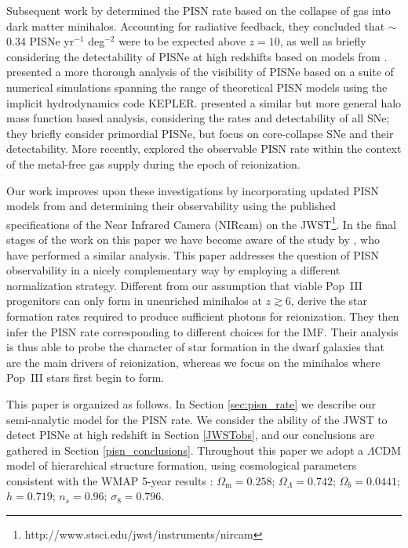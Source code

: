\documentclass[../thesis.tex]{subfiles}
\begin{document}
Subsequent work by \citet{WiseAbel2005} determined the PISN rate based
on the collapse of gas into dark matter minihalos. Accounting for
radiative feedback, they concluded that $\sim$0.34 PISNe yr$^{-1}$
deg$^{-2}$ were to be expected above $z=10$, as well as briefly
considering the detectability of PISNe at high redshifts based on
models from \citet{HegerWoosley2002}.  \citet{Scannapiecoetal2005}
presented a more thorough analysis of the visibility of PISNe based
on a suite of numerical simulations spanning the range of theoretical
PISN models using the implicit hydrodynamics code
KEPLER. \citet{MesingerJohnsonHaiman2006} presented a similar but more
general halo mass function based analysis, considering the rates and
detectability of all SNe; they briefly consider primordial PISNe, but
focus on core-collapse SNe and their detectability.  More recently,
\citet{TrentiStiavelliShull2009} explored the observable PISN rate
within the context of the metal-free gas supply during the epoch of
reionization.

Our work improves upon these investigations by incorporating updated
PISN models from \citet{KasenWoosleyHeger2011} and determining their
observability using the published specifications of the Near Infrared
Camera (NIRcam) on the
JWST\footnote{http://www.stsci.edu/jwst/instruments/nircam}.
In the final stages of the work on this paper we have become aware of
the study by \citet{PanKasenLoeb2012}, who have performed a similar
analysis. This paper addresses the question of PISN observability in a
nicely complementary way by employing a different normalization
strategy. Different from our assumption that viable Pop~III
progenitors can only form in unenriched minihalos at $z\gtrsim6$,
\citet{PanKasenLoeb2012} derive the star formation rates required to
produce sufficient photons for reionization.  They then infer the PISN
rate corresponding to different choices for the IMF.  Their analysis
is thus able to probe the character of star formation in the dwarf
galaxies that are the main drivers of reionization, whereas we focus
on the minihalos where Pop~III stars first begin to form.

This paper is organized as follows.  In Section \ref{sec:pisn_rate} we describe our
semi-analytic model for the PISN rate.  We consider the ability of the
JWST to detect PISNe at high redshift in Section \ref{JWSTobs}, and our
conclusions are gathered in Section \ref{pisn_conclusions}.  Throughout this paper we adopt
a $\Lambda$CDM model of hierarchical structure formation, using
cosmological parameters consistent with the WMAP 5-year results
\citep{Komatsu2009}: $\Omega_{\mathrm m} = 0.258$; $\Omega_{\Lambda}=0.742$;
$\Omega_b=0.0441$; $h=0.719$; $n_s=0.96$; $\sigma_8=0.796$.
\end{document}
